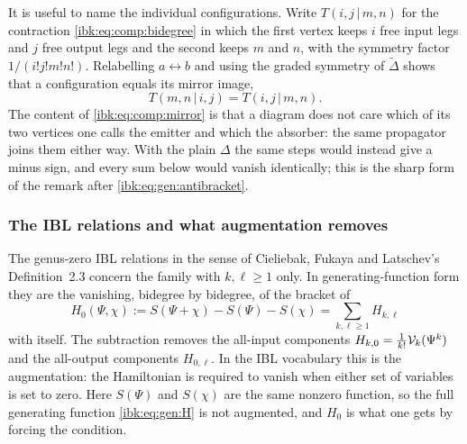 It is useful to name the individual configurations. Write $T(i,j\,|\,m,n)$ for the contraction \eqref{ibk:eq:comp:bidegree} in which the first vertex keeps $i$ free input legs and $j$ free output legs and the second keeps $m$ and $n$, with the symmetry factor $1/(i!j!m!n!)$. Relabelling $a\leftrightarrow b$ and using the graded symmetry of $\tilde\Delta$ shows that a configuration equals its mirror image,
\begin{equation}
  \label{ibk:eq:comp:mirror}
  T(m,n\,|\,i,j)
    = T(i,j\,|\,m,n).
\end{equation}
The content of \eqref{ibk:eq:comp:mirror} is that a diagram does not care which of its two vertices one calls the emitter and which the absorber: the same propagator joins them either way. With the plain $\Delta$ the same steps would instead give a minus sign, and every sum below would vanish identically; this is the sharp form of the remark after \eqref{ibk:eq:gen:antibracket}.

\subsubsection{The IBL relations and what augmentation removes}
\label{ibk:sec:comp:aug}

The genus-zero IBL relations in the sense of Cieliebak, Fukaya and Latschev's Definition~2.3 concern the family with $k,\ell\ge1$ only. In generating-function form they are the vanishing, bidegree by bidegree, of the bracket of
\begin{equation}
  \label{ibk:eq:comp:H0}
  H_0(\Psi,\chi)
    := S(\Psi+\chi)-S(\Psi)-S(\chi)
    = \sum_{k,\ell\ge1}H_{k,\ell}
\end{equation}
with itself. The subtraction removes the all-input components $H_{k,0}=\frac1{k!}{\mathcal{V}}_k(\Psi^k)$ and the all-output components $H_{0,\ell}$. In the IBL vocabulary this is the augmentation: the Hamiltonian is required to vanish when either set of variables is set to zero. Here $S(\Psi)$ and $S(\chi)$ are the same nonzero function, so the full generating function \eqref{ibk:eq:gen:H} is not augmented, and $H_0$ is what one gets by forcing the condition.

